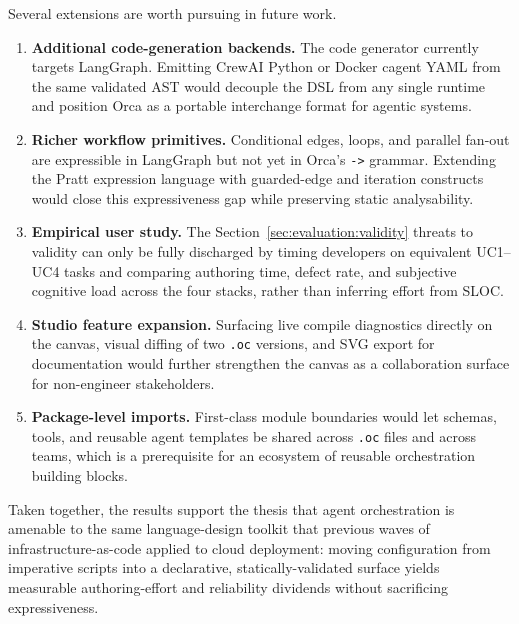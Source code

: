 \documentclass[sigconf,nonacm]{acmart}
\begin{document}
Several extensions are worth pursuing in future work.
\begin{enumerate}[leftmargin=*]
  \item \textbf{Additional code-generation backends.} The code generator
        currently targets LangGraph. Emitting CrewAI Python or Docker
        cagent YAML from the same validated AST would decouple the DSL
        from any single runtime and position Orca as a portable
        interchange format for agentic systems.
  \item \textbf{Richer workflow primitives.} Conditional edges,
        loops, and parallel fan-out are expressible in LangGraph but not
        yet in Orca's \texttt{->} grammar. Extending the Pratt expression
        language with guarded-edge and iteration constructs would close
        this expressiveness gap while preserving static analysability.
  \item \textbf{Empirical user study.} The Section~\ref{sec:evaluation:validity}
        threats to validity can only be fully discharged by timing
        developers on equivalent UC1--UC4 tasks and comparing authoring
        time, defect rate, and subjective cognitive load across the four
        stacks, rather than inferring effort from SLOC.
  \item \textbf{Studio feature expansion.} Surfacing live compile
        diagnostics directly on the canvas, visual diffing of two
        \texttt{.oc} versions, and SVG export for documentation would
        further strengthen the canvas as a collaboration surface for
        non-engineer stakeholders.
  \item \textbf{Package-level imports.} First-class module boundaries
        would let schemas, tools, and reusable agent templates be shared
        across \texttt{.oc} files and across teams, which is a
        prerequisite for an ecosystem of reusable orchestration building
        blocks.
\end{enumerate}

Taken together, the results support the thesis that agent orchestration is
amenable to the same language-design toolkit that previous waves of
infrastructure-as-code applied to cloud deployment: moving configuration
from imperative scripts into a declarative, statically-validated surface
yields measurable authoring-effort and reliability dividends without
sacrificing expressiveness.



\end{document}
